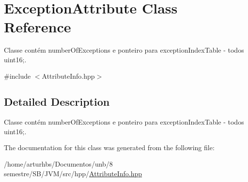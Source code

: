 \hypertarget{classExceptionAttribute}{}\section{Exception\+Attribute Class Reference}
\label{classExceptionAttribute}


Classe contém number\+Of\+Exceptions e ponteiro para exception\+Index\+Table -\/ todos uint16;.  




{\ttfamily \#include $<$Attribute\+Info.\+hpp$>$}



\subsection{Detailed Description}
Classe contém number\+Of\+Exceptions e ponteiro para exception\+Index\+Table -\/ todos uint16;. 

The documentation for this class was generated from the following file\+:\begin{DoxyCompactItemize}
\item 
/home/arturhbs/\+Documentos/unb/8 semestre/\+S\+B/\+J\+V\+M/src/hpp/\hyperlink{AttributeInfo_8hpp}{Attribute\+Info.\+hpp}\end{DoxyCompactItemize}
